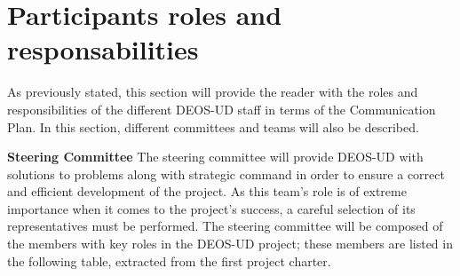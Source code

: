 \section{Participants roles and responsabilities}
As previously stated, this section will provide the reader with the roles and responsibilities of the different DEOS-UD staff in terms of the Communication Plan. In this section, different committees and teams will also be described. 

\textbf{Steering Committee}
\newline
\newline
The steering committee will provide DEOS-UD with solutions to problems along with strategic command in order to ensure a correct and efficient development of the project. As this team’s role is of extreme importance when it comes to the project’s success, a careful selection of its representatives must be performed. The steering committee will be composed of the members with key roles in the DEOS-UD project; these members are listed in the following table, extracted from the first project charter. 

